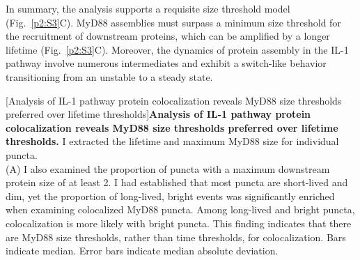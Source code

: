 In summary, the analysis supports a requisite size threshold model (Fig.~\ref{p2:S3}C). MyD88 assemblies must surpass a minimum size threshold for the recruitment of downstream proteins, which can be amplified by a longer lifetime (Fig.~\ref{p2:S3}C). Moreover, the dynamics of protein assembly in the IL-1 pathway involve numerous intermediates and exhibit a switch-like behavior transitioning from an unstable to a steady state.


\begin{centering}
\captionsetup{parbox=none}
[Analysis of IL-1 pathway protein colocalization reveals MyD88 size thresholds preferred over lifetime thresholds]{\textbf{Analysis of IL-1 pathway protein colocalization reveals MyD88 size thresholds preferred over lifetime thresholds.} I extracted the lifetime and maximum MyD88 size for individual puncta.
\vspace{1em}
\\
(A) I also examined the proportion of puncta with a maximum downstream protein size of at least 2\times. I had established that most puncta are short-lived and dim, yet the proportion of long-lived, bright events was significantly enriched when examining colocalized MyD88 puncta. Among long-lived and bright puncta, colocalization is more likely with bright puncta. This finding indicates that there are MyD88 size thresholds, rather than time thresholds, for colocalization. Bars indicate median. Error bars indicate median absolute deviation.
}
\end{centering}
